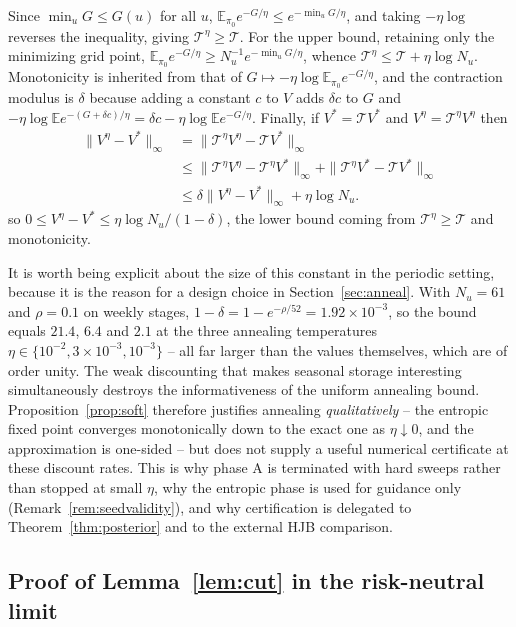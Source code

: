 \documentclass[pdflatex,sn-mathphys-num]{sn-jnl}
\theoremstyle{thmstyleone}
\theoremstyle{thmstyletwo}
\theoremstyle{thmstylethree}
\newcommand{\E}{\mathbb{E}}
\begin{document}
\begin{appendices}
Since $\min_u G\le G(u)$ for all $u$,
$\E_{\pi_0}e^{-G/\eta}\le e^{-\min_u G/\eta}$, and taking $-\eta\log$
reverses the inequality, giving $\mathcal T^\eta\ge\mathcal T$. For the
upper bound, retaining only the minimizing grid point,
$\E_{\pi_0}e^{-G/\eta}\ge N_u^{-1}e^{-\min_u G/\eta}$, whence
$\mathcal T^\eta\le\mathcal T+\eta\log N_u$. Monotonicity is inherited from
that of $G\mapsto-\eta\log\E_{\pi_0}e^{-G/\eta}$, and the contraction
modulus is $\delta$ because adding a constant $c$ to $V$ adds $\delta c$ to
$G$ and $-\eta\log\E e^{-(G+\delta c)/\eta}=\delta c
-\eta\log\E e^{-G/\eta}$. Finally, if $V^*=\mathcal T V^*$ and
$V^\eta=\mathcal T^\eta V^\eta$ then
\begin{align*}
\|V^\eta-V^*\|_\infty
&=\|\mathcal T^\eta V^\eta-\mathcal T V^*\|_\infty\\
&\le \|\mathcal T^\eta V^\eta-\mathcal T^\eta V^*\|_\infty
 +\|\mathcal T^\eta V^*-\mathcal T V^*\|_\infty\\
&\le \delta\|V^\eta-V^*\|_\infty+\eta\log N_u.
\end{align*}
so $0\le V^\eta-V^*\le\eta\log N_u/(1-\delta)$, the lower bound coming from
$\mathcal T^\eta\ge\mathcal T$ and monotonicity.

It is worth being explicit about the size of this constant in the periodic
setting, because it is the reason for a design choice in
Section~\ref{sec:anneal}. With $N_u=61$ and $\rho=0.1$ on weekly stages,
$1-\delta=1-e^{-\rho/52}=1.92\times10^{-3}$, so the bound equals
$21.4$, $6.4$ and $2.1$ at the three annealing temperatures
$\eta\in\{10^{-2},3\times10^{-3},10^{-3}\}$ -- all far larger than the
values themselves, which are of order unity. The weak discounting that
makes seasonal storage interesting simultaneously destroys the
informativeness of the uniform annealing bound. Proposition~\ref{prop:soft}
therefore justifies annealing \emph{qualitatively} -- the entropic fixed
point converges monotonically down to the exact one as $\eta\downarrow0$,
and the approximation is one-sided -- but does not supply a useful
numerical certificate at these discount rates. This is why phase A is
terminated with hard sweeps rather than stopped at small $\eta$, why the
entropic phase is used for guidance only
(Remark~\ref{rem:seedvalidity}), and why certification is delegated to
Theorem~\ref{thm:posterior} and to the external HJB comparison.

\subsection{Proof of Lemma~\ref{lem:cut} in the risk-neutral limit}
\label{app:cutlimit}


\end{appendices}
\end{document}
